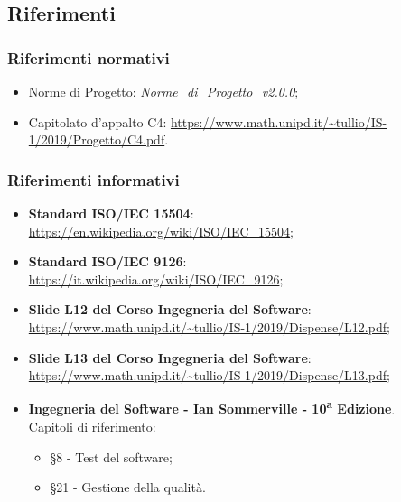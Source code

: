 \subsection{Riferimenti}
\subsubsection{Riferimenti normativi}
\begin{itemize}
	\item Norme di Progetto: \textit{Norme\_di\_Progetto\_v2.0.0};
	\item Capitolato d'appalto C4: \url{https://www.math.unipd.it/~tullio/IS-1/2019/Progetto/C4.pdf}.
\end{itemize}
\subsubsection{Riferimenti informativi}
\begin{itemize}
	\begin{comment}
	Spostato le norme a riferimento normativo
	\end{comment}
	\item \textbf{Standard ISO/IEC 15504}: \\
	\url{https://en.wikipedia.org/wiki/ISO/IEC_15504};
	\item \textbf{Standard ISO/IEC 9126}: \\
	\url{https://it.wikipedia.org/wiki/ISO/IEC_9126};
	\item \textbf{Slide L12 del Corso Ingegneria del Software}:\\
	\url{https://www.math.unipd.it/~tullio/IS-1/2019/Dispense/L12.pdf};
	\item \textbf{Slide L13 del Corso Ingegneria del Software}:\\
	\url{https://www.math.unipd.it/~tullio/IS-1/2019/Dispense/L13.pdf};
	\item \textbf{Ingegneria del Software - Ian Sommerville - 10\textsuperscript{a}  Edizione}.\\ Capitoli di riferimento: \begin{itemize}
	\item \S 8 - Test del software;
	\item \S 21 - Gestione della qualità.
	\end{itemize}
\end{itemize}